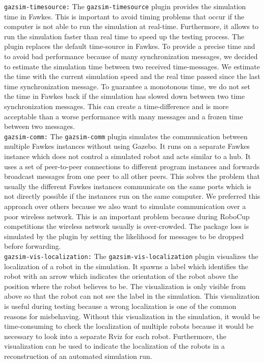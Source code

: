 \texttt{gazsim-timesource:}
The \texttt{gazsim-timesource} plugin provides the simulation time in Fawkes. This is important to avoid timing problems that occur if the computer is not able to run the simulation at real-time. Furthermore, it allows to run the simulation faster than real time to speed up the testing process. The plugin replaces the default time-source in Fawkes. To provide a precise time and to avoid bad performance because of many synchronization messages, we decided to estimate the simulation time between two received time-messages. We estimate the time with the current simulation speed and the real time passed since the last time synchronization message. To guarantee a monotonous time, we do not set the time in Fawkes back if the simulation has slowed down between two time synchronization messages. This can create a time-difference and is more acceptable than a worse performance with many messages and a frozen time between two messages.
\\

\texttt{gazsim-comm:}
The \texttt{gazsim-comm} plugin simulates the communication between multiple Fawkes instances without using Gazebo. It runs on a separate Fawkes instance which does not control a simulated robot and acts similar to a hub. It uses a set of peer-to-peer connections to different program instances and forwards broadcast messages from one peer to all other peers. This solves the problem that usually the different Fawkes instances communicate on the same ports which is not directly possible if the instances run on the same computer. We preferred this approach over others because we also want to simulate communication over a poor wireless network. This is an important problem because during RoboCup competitions the wireless network usually is over-crowded. The package loss is simulated by the plugin by setting the likelihood for messages to be dropped before forwarding.
\\

\texttt{gazsim-vis-localization:}
The \texttt{gazsim-vis-localization} plugin visualizes the localization of a robot in the simulation. It spawns a label which identifies the robot with an arrow which indicates the orientation of the robot above the position where the robot believes to be. The visualization is only visible from above so that the robot can not see the label in the simulation. This visualization is useful during testing because a wrong localization is one of the common reasons for misbehaving. Without this visualization in the simulation, it would be time-consuming to check the localization of multiple robots because it would be necessary to look into a separate Rviz for each robot. Furthermore, the visualization can be used to indicate the localization of the robots in a reconstruction of an automated simulation run.
\\


